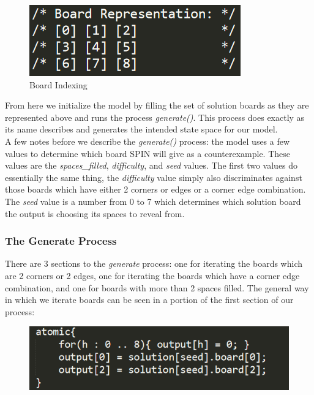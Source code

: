 \documentclass[a4paper]{article}
\begin{document}
\begin{figure} [h]
\centering
\includegraphics{board_indexing}
\caption{ Board Indexing }
\end{figure}

From here we initialize the model by filling the set of solution boards as they are represented above and runs the process {\it generate()}. This process does exactly as its name describes and generates the intended state space for our model.\\

A few notes before we describe the {\it generate()} process: the model uses a few values to determine which board SPIN will give as a counterexample. These values are the {\it spaces\_filled}, {\it difficulty}, and {\it seed} values. The first two values do essentially the same thing, the {\it difficulty} value simply also discriminates against those boards which have either 2 corners or edges or a corner edge combination. The {\it seed} value is a number from 0 to 7 which determines which solution board the output is choosing its spaces to reveal from.

\subsubsection{The Generate Process}

There are 3 sections to the {\it generate} process: one for iterating the boards which are 2 corners or 2 edges, one for iterating the boards which have a corner edge combination, and one for boards with more than 2 spaces filled. The general way in which we iterate boards can be seen in a portion of the first section of our process:

\begin{figure} [h]
\centering
\includegraphics{section_1}
\end{figure}
\end{document}
